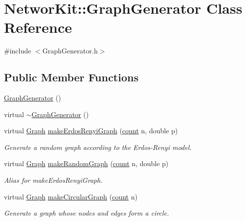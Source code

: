 \hypertarget{class_networ_kit_1_1_graph_generator}{\section{Networ\-Kit\-:\-:Graph\-Generator Class Reference}
\label{class_networ_kit_1_1_graph_generator}
}


{\ttfamily \#include $<$Graph\-Generator.\-h$>$}

\subsection*{Public Member Functions}
\begin{DoxyCompactItemize}
\item 
\hyperlink{class_networ_kit_1_1_graph_generator_aca81cef9e25ef06e72d5286ed674a75f}{Graph\-Generator} ()
\item 
virtual \hyperlink{class_networ_kit_1_1_graph_generator_a9b8b2a73a8be7bbe8c481335be21ad58}{$\sim$\-Graph\-Generator} ()
\item 
virtual \hyperlink{class_networ_kit_1_1_graph}{Graph} \hyperlink{class_networ_kit_1_1_graph_generator_aba5717e858cde8d115606c821d032961}{make\-Erdos\-Renyi\-Graph} (\hyperlink{namespace_networ_kit_ad4c536a5339a8bf2f91f418b9a67a7d8}{count} n, double p)
\begin{DoxyCompactList}\small\item\em Generate a random graph according to the Erdos-\/\-Renyi model. \end{DoxyCompactList}\item 
virtual \hyperlink{class_networ_kit_1_1_graph}{Graph} \hyperlink{class_networ_kit_1_1_graph_generator_af518e37d5588aa84c51cbca117340dc4}{make\-Random\-Graph} (\hyperlink{namespace_networ_kit_ad4c536a5339a8bf2f91f418b9a67a7d8}{count} n, double p)
\begin{DoxyCompactList}\small\item\em Alias for make\-Erdos\-Renyi\-Graph. \end{DoxyCompactList}\item 
virtual \hyperlink{class_networ_kit_1_1_graph}{Graph} \hyperlink{class_networ_kit_1_1_graph_generator_a7f8a211ff09c119c448c58a2fd58cda5}{make\-Circular\-Graph} (\hyperlink{namespace_networ_kit_ad4c536a5339a8bf2f91f418b9a67a7d8}{count} n)
\begin{DoxyCompactList}\small\item\em Generate a graph whose nodes and edges form a circle. \end{DoxyCompactList}\item 

\end{DoxyCompactItemize}
